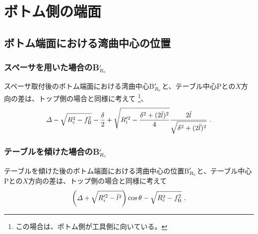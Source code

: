 \clearpage
\section{ボトム側の端面}



\subsection{ボトム端面における湾曲中心の位置}


\subsubsection{スペーサを用いた場合のB\texorpdfstring{$_{R_\text c}'$}{Rc'}}
スペーサ取付後のボトム端面における湾曲中心B$_{R_\text c}'$と、テーブル中心Pとの$X$方向の差は、トップ側の場合と同様に考えて
\footnote{この場合は、ボトム側が工具側に向いている。}、
\begin{align*}
  \varDelta-\sqrt{R_\text c^2-f_\text B^2}-\frac\delta2+\sqrt{R_\text i'^2-\frac{\delta^2+(2\bar l)^2}4}\frac{2\bar l}{\sqrt{\delta^2+(2\bar l)^2}}\ .
\end{align*}


\subsubsection{テーブルを傾けた場合のB\texorpdfstring{$_{R_\text c}'$}{Rc'}}
テーブルを傾けた後のボトム端面における湾曲中心の位置B$_{R_\text c}'$と、テーブル中心Pとの$X$方向の差は、トップ側の場合と同様に考えて
\begin{align*}
  \left(\varDelta+\sqrt{R_i'^2-\bar l^2}\right)\cos\theta-\sqrt{R_\text c^2-f_\text B^2}~.
\end{align*}



